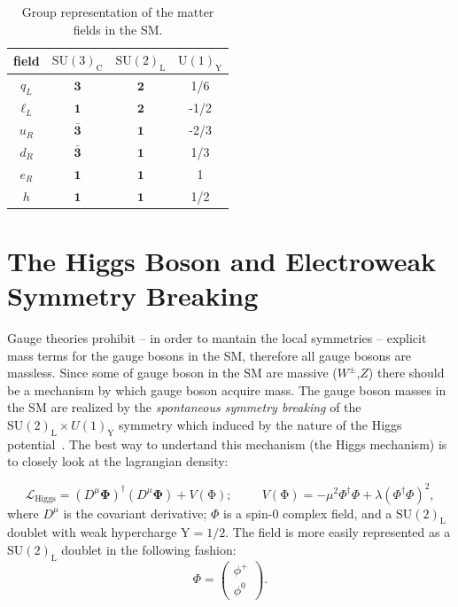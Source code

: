 \begin{table}[htb]
\centering
\large
\begin{tabular}{cccc}
  \hline
  \hline
  field &  $\mathrm{SU(3)_{C}}$ &  $\mathrm{SU(2)_{L}}$ & $\mathrm{U(1)_{Y}}$\\
  \hline                                                        
  $q_{L}$ & $\mathbf{3}$ &  $\mathbf{2}$ & 1/6\\
  $\ell_{L}$ & $\mathbf{1}$ &  $\mathbf{2}$ & -1/2\\
  $u_{R}$ & $\mathbf{\bar{3}}$ &  $\mathbf{1}$ &-2/3\\
  $d_{R}$ & $\mathbf{\bar{3}}$ &  $\mathbf{1}$ &1/3\\
  $e_{R}$ & $\mathbf{1}$ &  $\mathbf{1}$ & 1\\
  $h$ & $\mathbf{1}$ &  $\mathbf{1}$ & 1/2\\
  \hline
  \hline
\end{tabular}
  \caption{\label{tab:SMGroup} Group representation of the matter
    fields in the SM.}
\end{table}
\section{The Higgs Boson and Electroweak Symmetry
  Breaking}\label{higgs}
Gauge theories prohibit -- in order to mantain the local symmetries --  explicit mass terms for the gauge bosons in the SM,
therefore all gauge bosons are massless. Since some of gauge boson in
the SM are massive ($W^{\pm}$,$Z$) there should be a mechanism by
which gauge boson acquire mass. The gauge boson masses in the SM are
realized by the \textit{spontaneous symmetry breaking} of the
$\mathrm{SU(2)_{L}}\times U(1)_{\mathrm{Y}}$ symmetry which induced by the nature of
the Higgs potential~\cite{HIGGES}. The best way to undertand this mechanism (the
Higgs mechanism) is to closely look at the lagrangian density:

\begin{equation}
\label{eq:higgsPotential}
\mathcal{L}_{\mathrm{Higgs}} =
(D^{\mu}\mathbf{\Phi})^{\dagger}(D^{\mu}\mathbf{\Phi}) +
V(\mathrm{\Phi});\hspace{1cm} V(\mathrm{\Phi}) = -\mu^{2}\Phi^{\dagger}\Phi +\lambda(\Phi^{\dagger}\Phi)^{2},
\end{equation}
where $D^{\mu}$ is the covariant derivative; $\Phi$ is a spin-0
complex field, and a $\mathrm{SU(2)_{L}}$ doublet with weak
hypercharge $\mathrm{Y} = 1/2$. The field is more easily represented
as a $\mathrm{SU(2)_{L}}$ doublet in the following fashion:
\begin{equation}
\label{eq:higgdoublet}
\Phi = \begin{pmatrix} \phi^{+}\\
  \phi^{0}\end{pmatrix}.
\end{equation}

